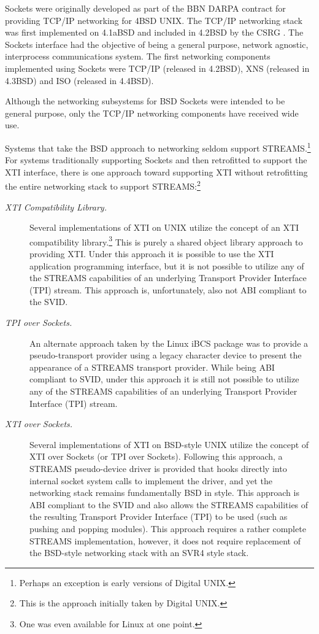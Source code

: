 \documentclass[letterpaper,final,notitlepage,twocolumn,10pt,twoside]{article}
\begin{document}
Sockets were originally developed as part of the BBN DARPA contract for
providing TCP/IP networking for 4BSD UNIX.  The TCP/IP networking stack was
first implemented on 4.1aBSD and included in 4.2BSD by the CSRG \cite[]{bsd}.
The Sockets interface had the objective of being a general purpose, network
agnostic, interprocess communications system.  The first networking components
implemented using Sockets were TCP/IP (released in 4.2BSD), XNS (released in
4.3BSD) and ISO (released in 4.4BSD).

Although the networking subsystems for BSD Sockets were intended to be general
purpose, only the TCP/IP networking components have received wide use.

Systems that take the BSD approach to networking seldom support
STREAMS.\footnote{Perhaps an exception is early versions of Digital UNIX.}
For systems traditionally supporting Sockets and then retrofitted to support
the XTI interface, there is one approach toward supporting XTI without
retrofitting the entire networking stack to support STREAMS:\footnote{This is
the approach initially taken by Digital UNIX.}

\begin{description}

\item[{\it XTI Compatibility Library.}]

Several implementations of XTI on UNIX utilize the concept of an XTI
compatibility library.\footnote{One was even available for Linux at one
point.}  This is purely a shared object library approach to providing XTI.
Under this approach it is possible to use the XTI application programming
interface, but it is not possible to utilize any of the STREAMS capabilities
of an underlying Transport Provider Interface (TPI) stream.  This approach is,
unfortunately, also not ABI compliant to the SVID.

\item[{\it TPI over Sockets.}]

An alternate approach taken by the Linux iBCS package was to provide a
pseudo-transport provider using a legacy character device to present the
appearance of a STREAMS transport provider.  While being ABI compliant to
SVID, under this approach it is still not possible to utilize any of the
STREAMS capabilities of an underlying Transport Provider Interface (TPI)
stream.

\item[{\it XTI over Sockets.}]

Several implementations of XTI on BSD-style UNIX utilize the concept of XTI
over Sockets (or TPI over Sockets).  Following this approach, a STREAMS
pseudo-device driver is provided that hooks directly into internal socket
system calls to implement the driver, and yet the networking stack remains
fundamentally BSD in style.  This approach is ABI compliant to the SVID and
also allows the STREAMS capabilities of the resulting Transport Provider
Interface (TPI) to be used (such as pushing and popping modules).  This
approach requires a rather complete STREAMS implementation, however, it does
not require replacement of the BSD-style networking stack with an SVR4 style
stack.

\end{description}
\end{document}
